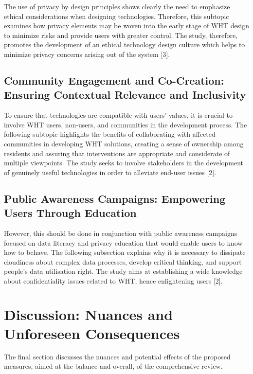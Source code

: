 \documentclass[11pt]{article}
\begin{document}
The use of privacy by design principles shows clearly the need to emphasize ethical considerations when designing technologies. Therefore, this subtopic examines how privacy elements may be woven into the early stage of WHT design to minimize risks and provide users with greater control. The study, therefore, promotes the development of an ethical technology design culture which helps to minimize privacy concerns arising out of the system [3].

\subsection{Community Engagement and Co-Creation: Ensuring Contextual Relevance and Inclusivity}

To ensure that technologies are compatible with users’ values, it is crucial to involve WHT users, non-users, and communities in the development process. The following subtopic highlights the benefits of collaborating with affected communities in developing WHT solutions, creating a sense of ownership among residents and assuring that interventions are appropriate and considerate of multiple viewpoints. The study seeks to involve stakeholders in the development of genuinely useful technologies in order to alleviate end-user issues [2].

\subsection{Public Awareness Campaigns: Empowering Users Through Education}

However, this should be done in conjunction with public awareness campaigns focused on data literacy and privacy education that would enable users to know how to behave. The following subsection explains why it is necessary to dissipate cloudiness about complex data processes, develop critical thinking, and support people’s data utilisation right. The study aims at establishing a wide knowledge about confidentiality issues related to WHT, hence enlightening users [2].

\section{Discussion: Nuances and Unforeseen Consequences}

The final section discusses the nuances and potential effects of the proposed measures, aimed at the balance and overall, of the comprehensive review.
\end{document}
